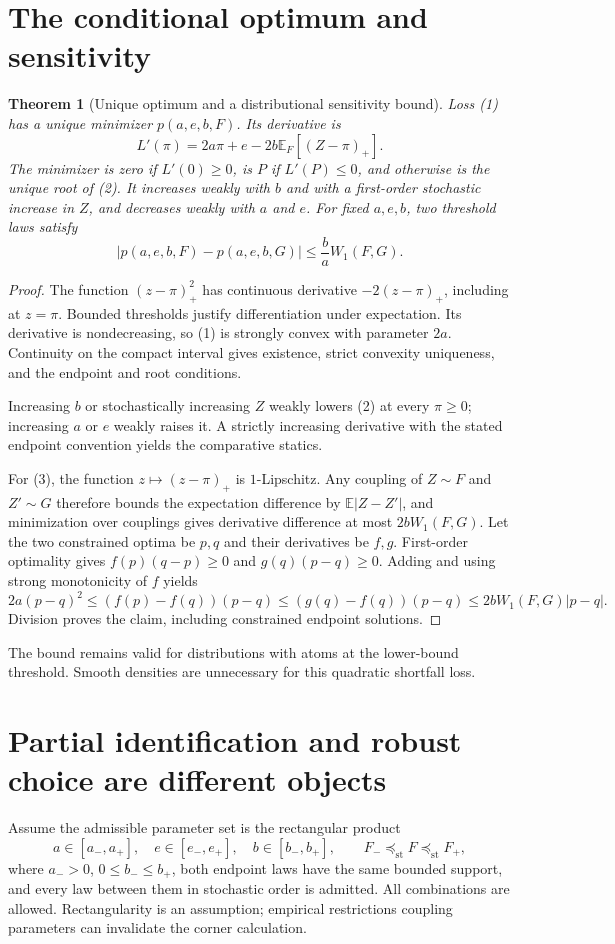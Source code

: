 \documentclass[11pt,a4paper]{article}
\newtheorem{theorem}{Theorem}[section]
\theoremstyle{remark}
\newcommand{\E}{\mathbb E}
\begin{document}
\section{The conditional optimum and sensitivity}
\begin{theorem}[Unique optimum and a distributional sensitivity bound]
Loss (1) has a unique minimizer $p(a,e,b,F)$. Its derivative is
\[
 L'(\pi)=2a\pi+e-2b\E_F[(Z-\pi)_+]. \tag{2}
\]
The minimizer is zero if $L'(0)\ge0$, is $P$ if $L'(P)\le0$, and otherwise is the unique root of (2). It increases weakly with $b$ and with a first-order stochastic increase in $Z$, and decreases weakly with $a$ and $e$. For fixed $a,e,b$, two threshold laws satisfy
\[
 |p(a,e,b,F)-p(a,e,b,G)|\le\frac ba W_1(F,G). \tag{3}
\]
\end{theorem}
\begin{proof}
The function $(z-\pi)_+^2$ has continuous derivative $-2(z-\pi)_+$, including at $z=\pi$. Bounded thresholds justify differentiation under expectation. Its derivative is nondecreasing, so (1) is strongly convex with parameter $2a$. Continuity on the compact interval gives existence, strict convexity uniqueness, and the endpoint and root conditions.

Increasing $b$ or stochastically increasing $Z$ weakly lowers (2) at every $\pi\ge0$; increasing $a$ or $e$ weakly raises it. A strictly increasing derivative with the stated endpoint convention yields the comparative statics.

For (3), the function $z\mapsto(z-\pi)_+$ is $1$-Lipschitz. Any coupling of $Z\sim F$ and $Z'\sim G$ therefore bounds the expectation difference by $\E|Z-Z'|$, and minimization over couplings gives derivative difference at most $2bW_1(F,G)$. Let the two constrained optima be $p,q$ and their derivatives be $f,g$. First-order optimality gives $f(p)(q-p)\ge0$ and $g(q)(p-q)\ge0$. Adding and using strong monotonicity of $f$ yields
\[
 2a(p-q)^2\le (f(p)-f(q))(p-q)
 \le (g(q)-f(q))(p-q)\le2bW_1(F,G)|p-q|.
\]
Division proves the claim, including constrained endpoint solutions.
\end{proof}
The bound remains valid for distributions with atoms at the lower-bound threshold. Smooth densities are unnecessary for this quadratic shortfall loss.

\section{Partial identification and robust choice are different objects}
Assume the admissible parameter set is the rectangular product
\[
 a\in[a_-,a_+],\quad e\in[e_-,e_+],\quad b\in[b_-,b_+],
 \qquad F_-\preceq_{\mathrm{st}}F\preceq_{\mathrm{st}}F_+,
\]
where $a_->0$, $0\le b_-\le b_+$, both endpoint laws have the same bounded support, and every law between them in stochastic order is admitted. All combinations are allowed. Rectangularity is an assumption; empirical restrictions coupling parameters can invalidate the corner calculation.
\end{document}
